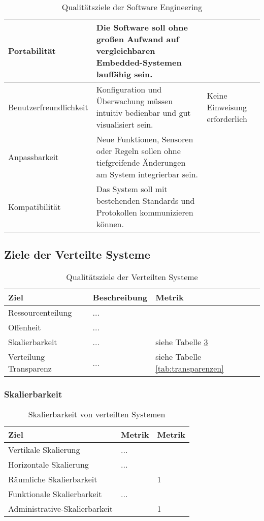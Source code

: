 \begin{table}[h!]
\begin{tabular}{p{4cm}|p{5cm}|p{5cm}|}
		\hline
		Portabilität & Die Software soll ohne großen Aufwand auf vergleichbaren Embedded-Systemen lauffähig sein. 
		& 
		\\
		\hline
		Benutzerfreundlichkeit & Konfiguration und Überwachung müssen intuitiv bedienbar und gut visualisiert sein. 
		& Keine Einweisung erforderlich
		\\
		\hline
		Anpassbarkeit & 
		Neue Funktionen, Sensoren oder Regeln sollen ohne tiefgreifende Änderungen am System integrierbar sein. 
		& 
		\\
		\hline
		Kompatibilität & 
		Das System soll mit bestehenden Standards und Protokollen kommunizieren können. 
		& 
		\\
		\hline
	\end{tabular}
	\caption{Qualitätsziele der Software Engineering}
	\label{tab:seziele}
\end{table}

\clearpage
\subsection{Ziele der Verteilte Systeme}
\begin{table}[h!]
	\centering
	\begin{tabular}{p{4cm}|p{5cm}|p{5cm}|}
		\hline
		\textbf{Ziel} & \textbf{Beschreibung} & \textbf{Metrik} \\
		\hline
		Ressourcenteilung  & ...& \\
		Offenheit & ...& \\
		Skalierbarkeit & ...& siehe Tabelle \ref{tab:skalierbarkeit} \\
		Verteilung Transparenz & ...& siehe Tabelle \ref{tab:transparenzen} \\
		\hline
	\end{tabular}
	\caption{Qualitätsziele der Verteilten Systeme}
	\label{tab:vsziele}
\end{table}

\subsubsection{Skalierbarkeit}
\begin{table}[h!]
	\centering
	\begin{tabular}{p{4cm}|p{5cm}|p{5cm}|}
		\hline
		\textbf{Ziel} & \textbf{Metrik} & \textbf{Metrik} \\
		\hline
		Vertikale Skalierung   & ... &\\
		\hline
		Horizontale Skalierung & ...& \\
		\hline
		Räumliche Skalierbarkeit &  & 1 \\
		\hline
		Funktionale Skalierbarkeit & ... & \\
		\hline
		Administrative-Skalierbarkeit & &1 \\
		\hline
	\end{tabular}
	\caption{Skalierbarkeit von verteilten Systemen}
	\label{tab:skalierbarkeit}
\end{table}

